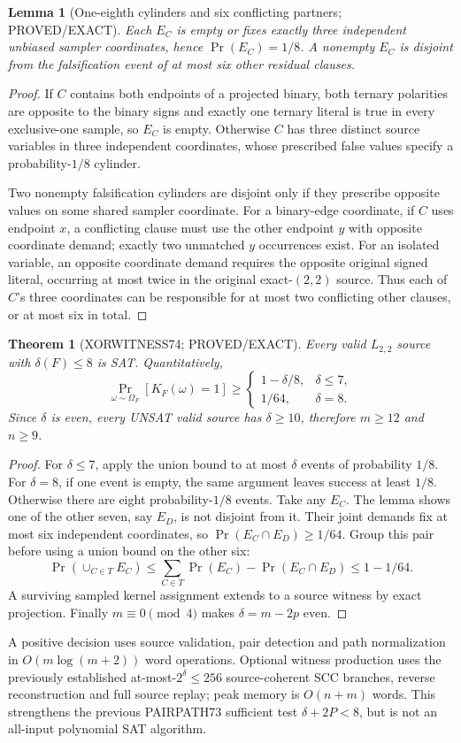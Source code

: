 \documentclass[11pt]{article}
\newtheorem{theorem}{Theorem}
\newtheorem{lemma}{Lemma}
\begin{document}
\begin{lemma}[One-eighth cylinders and six conflicting partners; PROVED/EXACT]
Each $E_C$ is empty or fixes exactly three independent unbiased sampler coordinates, hence $\Pr(E_C)=1/8$. A nonempty $E_C$ is disjoint from the falsification event of at most six other residual clauses.
\end{lemma}
\begin{proof}
If $C$ contains both endpoints of a projected binary, both ternary polarities are opposite to the binary signs and exactly one ternary literal is true in every exclusive-one sample, so $E_C$ is empty. Otherwise $C$ has three distinct source variables in three independent coordinates, whose prescribed false values specify a probability-$1/8$ cylinder.

Two nonempty falsification cylinders are disjoint only if they prescribe opposite values on some shared sampler coordinate. For a binary-edge coordinate, if $C$ uses endpoint $x$, a conflicting clause must use the other endpoint $y$ with opposite coordinate demand; exactly two unmatched $y$ occurrences exist. For an isolated variable, an opposite coordinate demand requires the opposite original signed literal, occurring at most twice in the original exact-$(2,2)$ source. Thus each of $C$'s three coordinates can be responsible for at most two conflicting other clauses, or at most six in total.
\end{proof}

\begin{theorem}[XORWITNESS74; PROVED/EXACT]
Every valid $L_{2,2}$ source with $\delta(F)\le8$ is SAT. Quantitatively,
\[
\Pr_{\omega\sim\Omega_F}[K_F(\omega)=1]\ge
\begin{cases}1-\delta/8,&\delta\le7,\\1/64,&\delta=8.\end{cases}
\]
Since $\delta$ is even, every UNSAT valid source has $\delta\ge10$, therefore $m\ge12$ and $n\ge9$.
\end{theorem}
\begin{proof}
For $\delta\le7$, apply the union bound to at most $\delta$ events of probability $1/8$. For $\delta=8$, if one event is empty, the same argument leaves success at least $1/8$. Otherwise there are eight probability-$1/8$ events. Take any $E_C$. The lemma shows one of the other seven, say $E_D$, is not disjoint from it. Their joint demands fix at most six independent coordinates, so $\Pr(E_C\cap E_D)\ge1/64$. Group this pair before using a union bound on the other six:
\[
\Pr(\cup_{C\in T}E_C)
\le\sum_{C\in T}\Pr(E_C)-\Pr(E_C\cap E_D)
\le1-1/64.
\]
A surviving sampled kernel assignment extends to a source witness by exact projection. Finally $m\equiv0\pmod4$ makes $\delta=m-2p$ even.
\end{proof}
A positive decision uses source validation, pair detection and path normalization in $O(m\log(m+2))$ word operations. Optional witness production uses the previously established at-most-$2^\delta\le256$ source-coherent SCC branches, reverse reconstruction and full source replay; peak memory is $O(n+m)$ words. This strengthens the previous PAIRPATH73 sufficient test $\delta+2P<8$, but is not an all-input polynomial SAT algorithm.
\end{document}
